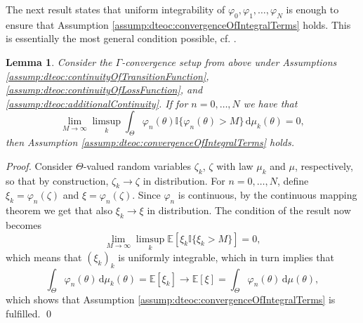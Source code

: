 \documentclass[letterpaper, 10 pt, conference]{IEEEconf}  %
\newcommand{\Indicator}[1]{\mathbb{I}\{{#1}\}}
\newcommand{\E}{\mathbb{E}} %
\newcommand{\diff}{\, \mathrm{d}} %
\theoremstyle{theorem}
\newtheorem{lemma}[theorem]{Lemma}
\theoremstyle{definition}
\theoremstyle{remark}
\begin{document}
The next result states that uniform integrability of $\varphi_0,\varphi_1,\ldots,\varphi_N$ is enough to ensure that Assumption \ref{assump:dteoc:convergenceOfIntegralTerms} holds.
This is essentially the most general condition possible, cf. \cite[Lemma~5.11]{kallenberg2021foundations}. 
\begin{lemma}
Consider the $\Gamma$-convergence setup from above under Assumptions \ref{assump:dteoc:continuityOfTransitionFunction}, \ref{assump:dteoc:continuityOfLossFunction}, and \ref{assump:dteoc:additionalContinuity}.
If for $n=0,\ldots,N$ we have that
\begin{equation}
     \lim_{M\rightarrow\infty} \limsup_{k} \int_\Theta \varphi_n(\theta) \Indicator{\varphi_n(\theta)>M} \diff \mu_k(\theta) = 0,
\end{equation}
then Assumption \ref{assump:dteoc:convergenceOfIntegralTerms} holds.
\end{lemma}
\begin{proof}
Consider $\Theta$-valued random variables $\zeta_k$, $\zeta$ with law $\mu_k$ and $\mu$, respectively, so that by construction, $\zeta_k \rightarrow \zeta$ in distribution.
For $n=0,\ldots,N$, define $\xi_k=\varphi_n(\zeta)$ and $\xi=\varphi_n(\zeta)$. 
Since $\varphi_n$ is continuous, by the continuous mapping theorem we get that also $\xi_k \rightarrow \xi$ in distribution.
The condition of the result now becomes
\begin{equation*}
    \lim_{M\rightarrow\infty} \limsup_{k} \E[\xi_k \Indicator{\xi_k >M}] = 0,
\end{equation*}
which means that $(\xi_k)_k$ is uniformly integrable,
which in turn implies that
\begin{equation*}
    \int_\Theta \varphi_n(\theta) \diff \mu_k(\theta) = \E[\xi_k]
    \rightarrow
    \E[\xi] = \int_\Theta \varphi_n(\theta) \diff \mu(\theta),
\end{equation*}
which shows that Assumption \ref{assump:dteoc:convergenceOfIntegralTerms} is fulfilled. \qed
\end{proof}
\end{document}
